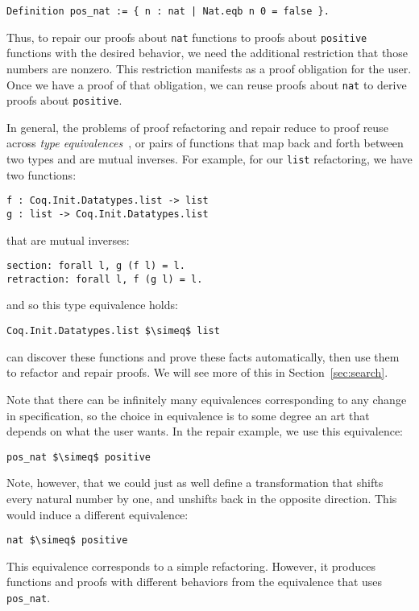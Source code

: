 \begin{lstlisting}
Definition pos_nat := { n : nat | Nat.eqb n 0 = false }.
\end{lstlisting}
Thus, to repair our proofs about \lstinline{nat} functions to proofs about \lstinline{positive} functions with the desired behavior,
we need the additional restriction that those numbers are nonzero. 
This restriction manifests as a proof obligation for the user.
Once we have a proof of that obligation, we can reuse proofs about \lstinline{nat} to derive
proofs about \lstinline{positive}.

In general, the problems of proof refactoring and repair reduce to proof reuse across \textit{type equivalences}~\cite{univalent2013homotopy},
or pairs of functions that map back and forth between two types and are mutual inverses.
For example, for our \lstinline{list} refactoring, we have two functions:

\begin{lstlisting}
f : Coq.Init.Datatypes.list -> list
g : list -> Coq.Init.Datatypes.list
\end{lstlisting}
that are mutual inverses:

\begin{lstlisting}
section: forall l, g (f l) = l.
retraction: forall l, f (g l) = l.
\end{lstlisting}
and so this type equivalence holds:

\begin{lstlisting}
Coq.Init.Datatypes.list $\simeq$ list
\end{lstlisting}
\toolname can discover these functions and prove these facts automatically, then use them to refactor and repair proofs.
We will see more of this in Section~\ref{sec:search}.

Note that there can be infinitely many equivalences corresponding to any change in specification,
so the choice in equivalence is to some degree an art that depends on what the user wants.
In the repair example, we use this equivalence:

\begin{lstlisting}
pos_nat $\simeq$ positive
\end{lstlisting}
Note, however, that we could just as well define a transformation that shifts every natural number by one,
and unshifts back in the opposite direction.
This would induce a different equivalence: %

\begin{lstlisting}
nat $\simeq$ positive
\end{lstlisting}
This equivalence corresponds to a simple refactoring.
However, it produces functions and proofs with different behaviors from the 
equivalence that uses \lstinline{pos_nat}.

